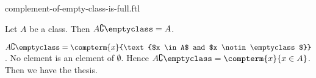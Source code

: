 \documentclass{article}
\begin{document}
\begin{smodule}[creators={Marcel Schütz}]{complement-of-empty-class-is-full.ftl}

  \begin{fproposition*}[label=771302931562496]
    Let $A$ be a class.
    Then $A \complement \emptyclass = A$.
  \end{fproposition*}
  \begin{fproof}
    $A \complement \emptyclass = \compterm{x}{\text{$x \in A$ and $x \notin \emptyclass$}}$.
    No element is an element of $\emptyset$.
    Hence $A \complement \emptyclass = \compterm{x}{x \in A}$.
    Then we have the thesis.
  \end{fproof}
\end{smodule}
\end{document}
